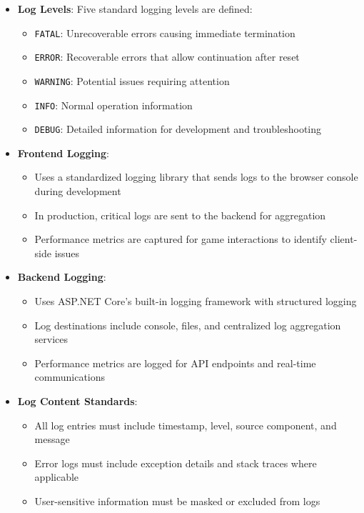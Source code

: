 \begin{itemize}
    \item \textbf{Log Levels}: Five standard logging levels are defined:
    \begin{itemize}
        \item \texttt{FATAL}: Unrecoverable errors causing immediate termination
        \item \texttt{ERROR}: Recoverable errors that allow continuation after reset
        \item \texttt{WARNING}: Potential issues requiring attention
        \item \texttt{INFO}: Normal operation information
        \item \texttt{DEBUG}: Detailed information for development and troubleshooting
    \end{itemize}
    
    \item \textbf{Frontend Logging}:
    \begin{itemize}
        \item Uses a standardized logging library that sends logs to the browser console during development
        \item In production, critical logs are sent to the backend for aggregation
        \item Performance metrics are captured for game interactions to identify client-side issues
    \end{itemize}
    
    \item \textbf{Backend Logging}:
    \begin{itemize}
        \item Uses ASP.NET Core's built-in logging framework with structured logging
        \item Log destinations include console, files, and centralized log aggregation services
        \item Performance metrics are logged for API endpoints and real-time communications
    \end{itemize}
    
    \item \textbf{Log Content Standards}:
    \begin{itemize}
        \item All log entries must include timestamp, level, source component, and message
        \item Error logs must include exception details and stack traces where applicable
        \item User-sensitive information must be masked or excluded from logs
    \end{itemize}
\end{itemize}

